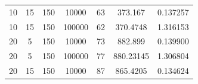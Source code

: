 \documentclass[11pt,a4paper]{report}
\begin{document}
\begin{table}[H]
{\begin{tabular}{c|c|c|c|c|c|c}
10                                                                                   & 15                                                                                     & 150                                                                        & 10000                                                                     & 63                                                                                        & 373.167                                                                   & 0.137257              \\
10                                                                                   & 15                                                                                     & 150                                                                        & 100000                                                                    & 62                                                                                        & 370.4748                                                                  & 1.316153              \\ \hline
20                                                                                   & 5                                                                                      & 150                                                                        & 10000                                                                     & 73                                                                                        & 882.899                                                                   & 0.139900              \\
20                                                                                   & 5                                                                                      & 150                                                                        & 100000                                                                    & 77                                                                                        & 880.23145                                                                 & 1.306804              \\ \hline
20                                                                                   & 15                                                                                     & 150                                                                        & 10000                                                                     & 87                                                                                        & 865.4205                                                                  & 0.134624              \\

\end{tabular}}
\end{table}
\end{document}
